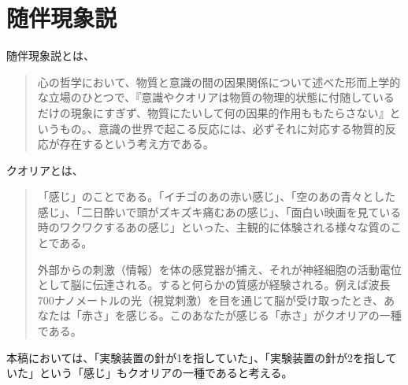 \section{随伴現象説}
随伴現象説とは、
\begin{quotation}
心の哲学において、物質と意識の間の因果関係について述べた形而上学的な立場のひとつで、『意識やクオリアは物質の物理的状態に付随しているだけの現象にすぎず、物質にたいして何の因果的作用ももたらさない』というもの。、意識の世界で起こる反応には、必ずそれに対応する物質的反応が存在するという考え方である。\cite{wikipedia}
\end{quotation}
クオリアとは、
\begin{quotation}
「感じ」のことである。「イチゴのあの赤い感じ」、「空のあの青々とした感じ」、「二日酔いで頭がズキズキ痛むあの感じ」、「面白い映画を見ている時のワクワクするあの感じ」といった、主観的に体験される様々な質のことである。\par
外部からの刺激（情報）を体の感覚器が捕え、それが神経細胞の活動電位として脳に伝達される。すると何らかの質感が経験される。例えば波長700ナノメートルの光（視覚刺激）を目を通じて脳が受け取ったとき、あなたは「赤さ」を感じる。このあなたが感じる「赤さ」がクオリアの一種である。\cite{wikipediaa}
\end{quotation}
本稿においては、「実験装置の針が1を指していた」、「実験装置の針が2を指していた」という「感じ」もクオリアの一種であると考える。